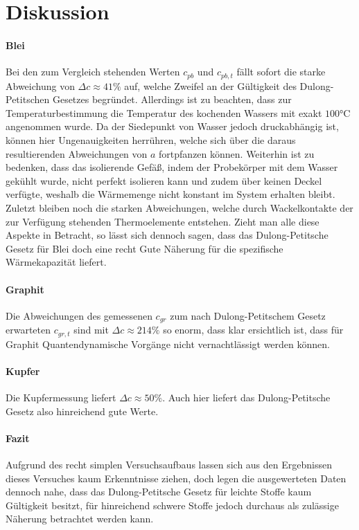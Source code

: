 \section{Diskussion}
\label{sec:Diskussion}


\paragraph{Blei}

Bei den zum Vergleich stehenden Werten $c_{pb}$ und $c_{pb,t}$ fällt sofort die starke Abweichung von $\Delta c \approx 41 \%$ auf, welche Zweifel an der Gültigkeit des Dulong-Petitschen Gesetzes begründet. Allerdings ist zu beachten, dass zur Temperaturbestimmung die Temperatur des kochenden Wassers mit exakt $100 \si{\celsius}$ angenommen wurde. Da der Siedepunkt von Wasser jedoch druckabhängig ist, können hier Ungenauigkeiten herrühren, welche sich über die daraus resultierenden Abweichungen von $a$ fortpfanzen können. Weiterhin ist zu bedenken, dass das isolierende Gefäß, indem der Probekörper mit dem Wasser gekühlt wurde, nicht perfekt isolieren kann und zudem über keinen Deckel verfügte, weshalb die Wärmemenge nicht konstant im System erhalten bleibt. Zuletzt bleiben noch die starken Abweichungen, welche durch Wackelkontakte der zur Verfügung stehenden Thermoelemente entstehen.
Zieht man alle diese Aspekte in Betracht, so lässt sich dennoch sagen, dass das Dulong-Petitsche Gesetz für Blei doch eine recht Gute Näherung für die spezifische Wärmekapazität liefert.

\paragraph{Graphit}
Die Abweichungen des gemessenen $c_{gr}$ zum nach Dulong-Petitschem Gesetz erwarteten $c_{gr,t}$ sind mit $\Delta c \approx 214 \%$ so enorm, dass klar ersichtlich ist, dass für Graphit Quantendynamische Vorgänge nicht vernachtlässigt werden können.

\paragraph{Kupfer}
Die Kupfermessung liefert $\Delta c \approx 50 \%$. Auch hier liefert das Dulong-Petitsche Gesetz also hinreichend gute Werte.

\paragraph{Fazit}
Aufgrund des recht simplen Versuchsaufbaus lassen sich aus den Ergebnissen dieses Versuches kaum Erkenntnisse ziehen, doch legen die ausgewerteten Daten dennoch nahe, dass das Dulong-Petitsche Gesetz für leichte Stoffe kaum Gültigkeit besitzt, für hinreichend schwere Stoffe jedoch durchaus als zulässige Näherung betrachtet werden kann.
